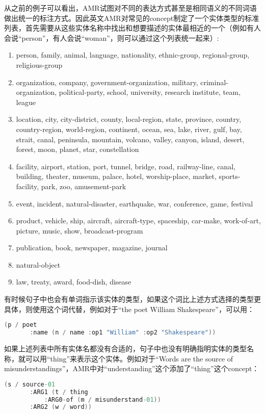 \documentclass[master, winfont]{njuthesis}
\begin{document}
从之前的例子可以看出，AMR试图对不同的表达方式甚至是相同语义的不同词语做出统一的标注方式。因此英文AMR对常见的concept制定了一个实体类型的标准列表，首先需要从这些实体名称中找出和想要描述的实体最相近的一个（例如有人会说“person”，有人会说“woman”，则可以通过这个列表统一起来）:
\begin{enumerate}
  \item person, family, animal, language, nationality, ethnic-group, regional-group, religious-group
  \item organization, company, government-organization, military, criminal-organization, political-party, school, university, research institute, team, league
  \item location, city, city-district, county, local-region, state, province, country, country-region, world-region, continent, ocean, sea, lake, river, gulf, bay, strait, canal, peninsula, mountain, volcano, valley, canyon, island, desert, forest, moon, planet, star, constellation
  \item facility, airport, station, port, tunnel, bridge, road, railway-line, canal, building, theater, museum, palace, hotel, worship-place, market, sports-facility, park, zoo, amusement-park
  \item event, incident, natural-disaster, earthquake, war, conference, game, festival
  \item product, vehicle, ship, aircraft, aircraft-type, spaceship, car-make, work-of-art, picture, music, show, broadcast-program
  \item publication, book, newspaper, magazine, journal
  \item natural-object
  \item law, treaty, award, food-dish, disease
\end{enumerate}

有时候句子中也会有单词指示该实体的类型，如果这个词比上述方式选择的类型更具体，则使用这个词代替，例如对于“the poet William Shakespeare”，可以用：
\begin{lstlisting}[language=C]
   (p / poet
       :name (n / name :op1 "William" :op2 "Shakespeare"))
\end{lstlisting}

如果上述列表中所有实体名都没有合适的，句子中也没有明确指明实体的类型名称，就可以用“thing”来表示这个实体。例如对于“Words are the source of misunderstandings”，AMR中对“understanding”这个添加了“thing”这个concept：
\begin{lstlisting}[language=C]
   (s / source-01
       :ARG1 (t / thing
           :ARG0-of (m / misunderstand-01))
       :ARG2 (w / word))
\end{lstlisting}
\end{document}
